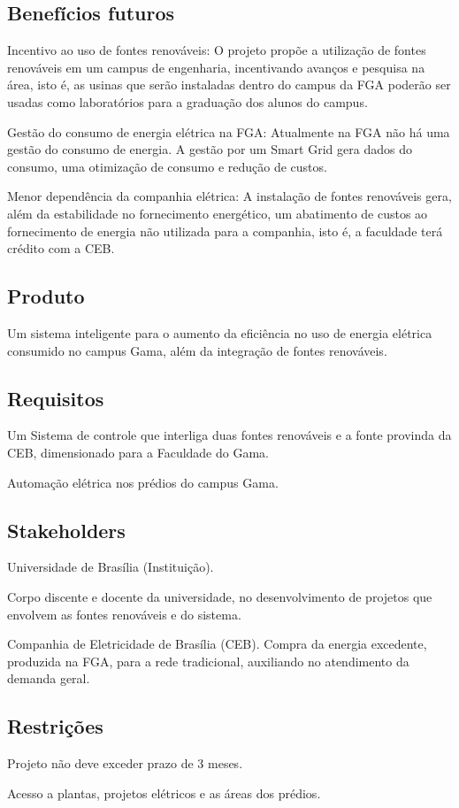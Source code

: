 \subsection{Benefícios futuros}
Incentivo ao uso de fontes renováveis: O projeto propõe a utilização de fontes renováveis em um campus de engenharia, incentivando avanços e pesquisa na área, isto é, as usinas que serão instaladas dentro do campus da FGA poderão ser usadas como laboratórios para a graduação dos alunos do campus.
\par Gestão do consumo de energia elétrica na FGA: Atualmente na FGA não há uma gestão do consumo de energia. A gestão por um Smart Grid gera dados do consumo, uma otimização de consumo e redução de custos.
\par Menor dependência da companhia elétrica: A instalação de fontes renováveis gera, além da estabilidade no fornecimento energético, um abatimento de custos ao fornecimento de energia não utilizada para a companhia, isto é, a faculdade terá crédito com a CEB.

\subsection{Produto}
Um sistema inteligente para o aumento da eficiência no uso de energia elétrica consumido no campus Gama, além da integração de fontes renováveis.

\subsection{Requisitos}
Um Sistema de controle que interliga duas fontes renováveis e a fonte provinda da CEB, dimensionado para a Faculdade do Gama.
\par Automação elétrica nos prédios do campus Gama.

\subsection{Stakeholders}
Universidade de Brasília (Instituição).
\par Corpo discente e docente da universidade, no desenvolvimento de projetos que envolvem as fontes renováveis e do sistema.
\par Companhia de Eletricidade de Brasília (CEB). Compra da energia excedente, produzida na FGA, para a rede tradicional, auxiliando no atendimento da demanda geral.

\subsection{Restrições}
Projeto não deve exceder prazo de 3 meses.
\par Acesso a plantas, projetos elétricos e as áreas dos prédios.

